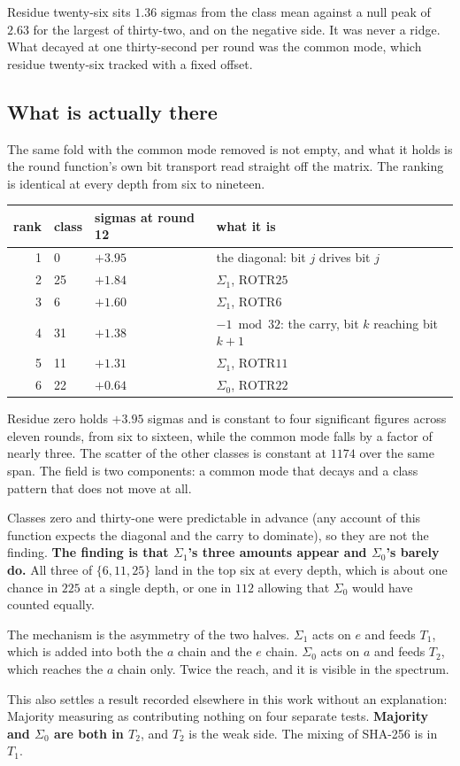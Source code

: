 Residue twenty-six sits \(1.36\) sigmas from the class mean against a null peak of \(2.63\) for the
largest of thirty-two, and on the negative side. It was never a ridge. What decayed at one
thirty-second per round was the common mode, which residue twenty-six tracked with a fixed offset.

\subsection{What is actually there}

The same fold with the common mode removed is not empty, and what it holds is the round function's
own bit transport read straight off the matrix. The ranking is identical at every depth from six to
nineteen.

\begin{center}
\begin{tabular}{rlll}
\toprule
rank & class & sigmas at round 12 & what it is \\
\midrule
1 & 0 & \(+3.95\) & the diagonal: bit \(j\) drives bit \(j\) \\
2 & 25 & \(+1.84\) & \(\Sigma_1\), \(\mathrm{ROTR}25\) \\
3 & 6 & \(+1.60\) & \(\Sigma_1\), \(\mathrm{ROTR}6\) \\
4 & 31 & \(+1.38\) & \(-1 \bmod 32\): the carry, bit \(k\) reaching bit \(k+1\) \\
5 & 11 & \(+1.31\) & \(\Sigma_1\), \(\mathrm{ROTR}11\) \\
6 & 22 & \(+0.64\) & \(\Sigma_0\), \(\mathrm{ROTR}22\) \\
\bottomrule
\end{tabular}
\end{center}

Residue zero holds \(+3.95\) sigmas and is constant to four significant figures across eleven
rounds, from six to sixteen, while the common mode falls by a factor of nearly three. The scatter
of the other classes is constant at \(1174\) over the same span. The field is two components: a
common mode that decays and a class pattern that does not move at all.

Classes zero and thirty-one were predictable in advance (any account of this function expects the
diagonal and the carry to dominate), so they are not the finding. \textbf{The finding is that
\(\Sigma_1\)'s three amounts appear and \(\Sigma_0\)'s barely do.} All three of
\(\{6, 11, 25\}\) land in the top six at every depth, which is about one chance in \(225\) at a
single depth, or one in \(112\) allowing that \(\Sigma_0\) would have counted equally.

The mechanism is the asymmetry of the two halves. \(\Sigma_1\) acts on \(e\) and feeds \(T_1\),
which is added into both the \(a\) chain and the \(e\) chain. \(\Sigma_0\) acts on \(a\) and feeds
\(T_2\), which reaches the \(a\) chain only. Twice the reach, and it is visible in the spectrum.

This also settles a result recorded elsewhere in this work without an explanation: Majority
measuring as contributing nothing on four separate tests. \textbf{Majority and \(\Sigma_0\) are both
in \(T_2\)}, and \(T_2\) is the weak side. The mixing of SHA-256 is in \(T_1\).
